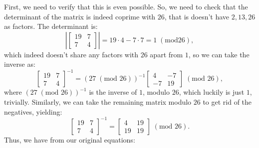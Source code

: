 \documentclass{article}
\begin{document}
\noindent First, we need to verify that this is even possible. So, we need to check that the determinant of the matrix is indeed coprime with $26$, that is doesn't have $2, 13, 26$ as factors. The determinant is:
\[
    \left|\begin{bmatrix}
        19 & 7 \\
        7 & 4
    \end{bmatrix}\right| = 19 \cdot 4 - 7 \cdot 7 = 1 \; (\text{mod} 26),
\]
which indeed doesn't share any factors with $26$ apart from $1$, so we can take the inverse as:
\[
    \begin{bmatrix}
        19 & 7 \\
        7 & 4
    \end{bmatrix}^{-1} = (27 \; (\text{mod } 26))^{-1} \begin{bmatrix}
        4 & -7 \\
        -7 & 19
    \end{bmatrix} \; (\text{mod } 26),
\]
where $(27 \; (\text{mod } 26))^{-1}$ is the inverse of $1$, modulo $26$, which luckily is just $1$, trivially. Similarly, we can take the remaining matrix modulo $26$ to get rid of the negatives, yielding:
\[
    \begin{bmatrix}
        19 & 7 \\
        7 & 4
    \end{bmatrix}^{-1} = \begin{bmatrix}
        4 & 19 \\
        19 & 19
    \end{bmatrix} \; (\text{mod } 26).
\]
Thus, we have from our original equations:
\end{document}
